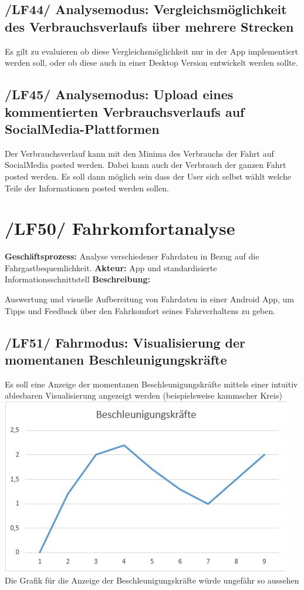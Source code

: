 \subsection{/LF44/ Analysemodus: Vergleichsmöglichkeit des Verbrauchsverlaufs über mehrere Strecken}
\nextline
Es gilt zu evaluieren ob diese Vergleichsmöglichkeit nur in der App implementiert werden soll, oder ob diese auch in einer Desktop Version entwickelt werden sollte.

\subsection{/LF45/ Analysemodus: Upload eines kommentierten Verbrauchsverlaufs auf SocialMedia-Plattformen }
Der Verbrauchsverlauf kann mit den Minima des Verbrauchs der Fahrt auf SocialMedia posted werden. Dabei kann auch der Verbrauch der ganzen Fahrt posted werden. Es soll dann möglich sein dass der User sich selbst wählt welche Teile der Informationen posted werden sollen.
\newpage

\section{/LF50/ Fahrkomfortanalyse}
\textbf{Geschäftsprozess:}	Analyse verschiedener Fahrdaten in Bezug auf die Fahrgastbequemlichkeit.
\textbf{Akteur:}			App und standardisierte Informationsschnittstell
\textbf{Beschreibung:}	

Auswertung und visuelle Aufbereitung von Fahrdaten in einer Android App, um Tipps und Feedback über den Fahrkomfort seines Fahrverhaltens zu geben.

\subsection{/LF51/ Fahrmodus: Visualisierung der momentanen Beschleunigungskräfte}
\nextline
Es soll eine Anzeige der momentanen Beschleunigungskräfte mittels einer intuitiv ablesbaren Visualisierung angezeigt werden (beispielsweise kammscher Kreis)
\nextline
\includegraphics{images/LF51_Beschleunigung.jpg}
\nextline
Die Grafik für die Anzeige der Beschleunigungskräfte würde ungefähr so aussehen

